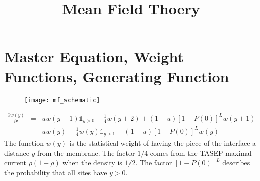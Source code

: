\documentclass[a4paper,10pt]{article}
\title{Mean Field Thoery}
\author{}
\date{}
\newcommand{\pzero}{P(0)}
\newcommand{\wy}{w(y)}
\newcommand{\I}{\mathbb{1}}
\begin{document}
\maketitle

\section{Master Equation, Weight Functions, Generating Function}

\begin{figure}[h!]
  \centering
  \texttt{[image: mf\_schematic]}
\end{figure}

\begin{eqnarray}
  \frac{\partial \wy}{\partial t} & = & uw(y-1) \I_{y>0} + \frac{1}{4}w(y+2) + (1-u)[1-\pzero]^L w(y+1) \nonumber \\
				  & - & uw(y) - \frac{1}{4} \wy \I_{y>1} - (1-u) [1-\pzero]^L \wy
\end{eqnarray}
The function $w(y)$ is the statistical weight of having the piece of the interface a distance $y$ from the membrane. The factor $1/4$ comes from the TASEP maximal current $\rho(1-\rho)$ when the density is $1/2$. The factor $[1-\pzero]^L$ describes the probability that all sites have $y>0$.
\end{document}

